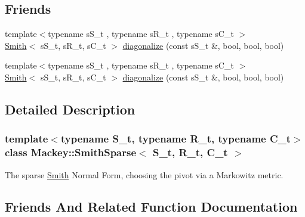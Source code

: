 \subsection*{Friends}
\begin{DoxyCompactItemize}
\item 
{\footnotesize template$<$typename s\+S\+\_\+t , typename s\+R\+\_\+t , typename s\+C\+\_\+t $>$ }\\\hyperlink{classMackey_1_1Smith}{Smith}$<$ s\+S\+\_\+t, s\+R\+\_\+t, s\+C\+\_\+t $>$ \hyperlink{classMackey_1_1SmithSparse_a020186c97759855bd063eeaaf0a17351}{diagonalize} (const s\+S\+\_\+t \&, bool, bool, bool)
\item 
{\footnotesize template$<$typename s\+S\+\_\+t , typename s\+R\+\_\+t , typename s\+C\+\_\+t $>$ }\\\hyperlink{classMackey_1_1Smith}{Smith}$<$ s\+S\+\_\+t, s\+R\+\_\+t, s\+C\+\_\+t $>$ \hyperlink{classMackey_1_1SmithSparse_a020186c97759855bd063eeaaf0a17351}{diagonalize} (const s\+S\+\_\+t \&, bool, bool, bool)
\end{DoxyCompactItemize}


\subsection{Detailed Description}
\subsubsection*{template$<$typename S\+\_\+t, typename R\+\_\+t, typename C\+\_\+t$>$\newline
class Mackey\+::\+Smith\+Sparse$<$ S\+\_\+t, R\+\_\+t, C\+\_\+t $>$}

The sparse \hyperlink{classMackey_1_1Smith}{Smith} Normal Form, choosing the pivot via a Markowitz metric. 

\subsection{Friends And Related Function Documentation}
\mbox{\label{classMackey_1_1SmithSparse_a020186c97759855bd063eeaaf0a17351}} 
